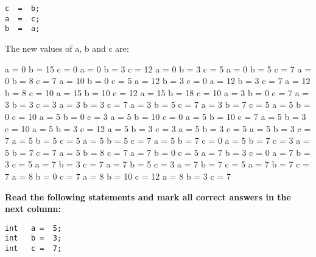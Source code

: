\documentclass[10pt]{exam}
\begin{document}
\begin{questions}
\begin{minipage}[t][][t]{0.18\textwidth}
\begin{lstlisting}
c  =  b;
a  =  c;
b  =  a;
  \end{lstlisting}
\end{minipage}
  \hfill
\begin{minipage}[t][][t]{0.75\textwidth}
  The new values of a, b and c are:
  \begin{multicols*}{3}
\begin{checkboxes}
    \choice a = 0 b = 15 c = 0
    \choice a = 0 b = 3 c = 12
    \choice a = 0 b = 3 c = 5
    \choice a = 0 b = 5 c = 7
    \choice a = 0 b = 8 c = 7
    \choice a = 10 b = 0 c = 5
    \choice a = 12 b = 3 c = 0
    \choice a = 12 b = 3 c = 7
    \choice a = 12 b = 8 c = 10
    \choice a = 15 b = 10 c = 12
    \choice a = 15 b = 18 c = 10
    \choice a = 3 b = 0 c = 7
    \choice a = 3 b = 3 c = 3
    \choice a = 3 b = 3 c = 7
    \choice a = 3 b = 5 c = 7
    \choice a = 3 b = 7 c = 5
    \choice a = 5 b = 0 c = 10
    \choice a = 5 b = 0 c = 3
    \choice a = 5 b = 10 c = 0
    \choice a = 5 b = 10 c = 7
    \choice a = 5 b = 3 c = 10
    \choice a = 5 b = 3 c = 12
    \choice a = 5 b = 3 c = 3
    \choice a = 5 b = 3 c = 5
    \choice a = 5 b = 3 c = 7
    \choice a = 5 b = 5 c = 5
    \choice a = 5 b = 5 c = 7
    \choice a = 5 b = 7 c = 0
    \choice a = 5 b = 7 c = 3
    \choice a = 5 b = 7 c = 7
    \choice a = 5 b = 8 c = 7
    \choice a = 7 b = 0 c = 5
    \choice a = 7 b = 3 c = 0
    \choice a = 7 b = 3 c = 5
    \choice a = 7 b = 3 c = 7
    \choice a = 7 b = 5 c = 3
    \choice a = 7 b = 7 c = 5
    \choice a = 7 b = 7 c = 7
    \choice a = 8 b = 0 c = 7
    \choice a = 8 b = 10 c = 12
    \choice a = 8 b = 3 c = 7
  \end{checkboxes}
\end{multicols*}
\end{minipage}

\vspace{1cm}  \begin{minipage}[t][][t]{0.18\textwidth}
\question \bf Read the following statements and mark all correct answers in the next column: \raggedright
  \begin{lstlisting}
int   a =  5;
int   b =  3;
int   c =  7;


\end{lstlisting}
\end{minipage}
\end{questions}
\end{document}
